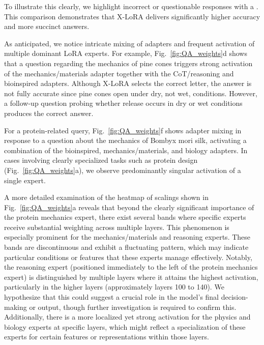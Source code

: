 To illustrate this clearly, we highlight incorrect or questionable responses with a . This comparison demonstrates that X-LoRA delivers significantly higher accuracy and more succinct answers.

As anticipated, we notice intricate mixing of adapters and frequent activation of multiple dominant LoRA experts. For example, Fig.~\ref{fig:QA_weights}d shows that a question regarding the mechanics of pine cones triggers strong activation of the mechanics/materials adapter together with the CoT/reasoning and bioinspired adapters. Although X-LoRA selects the correct letter, the answer is not fully accurate since pine cones open under dry, not wet, conditions. However, a follow-up question probing whether release occurs in dry or wet conditions produces the correct answer.

For a protein-related query, Fig.~\ref{fig:QA_weights}f shows adapter mixing in response to a question about the mechanics of Bombyx mori silk, activating a combination of the bioinspired, mechanics/materials, and biology adapters. In cases involving clearly specialized tasks such as protein design (Fig.~\ref{fig:QA_weights}a), we observe predominantly singular activation of a single expert.

A more detailed examination of the heatmap of scalings shown in Fig.~\ref{fig:QA_weights}a reveals that beyond the clearly significant importance of the protein mechanics expert, there exist several bands where specific experts receive substantial weighting across multiple layers. This phenomenon is especially prominent for the mechanics/materials and reasoning experts. These bands are discontinuous and exhibit a fluctuating pattern, which may indicate particular conditions or features that these experts manage effectively. Notably, the reasoning expert (positioned immediately to the left of the protein mechanics expert) is distinguished by multiple layers where it attains the highest activation, particularly in the higher layers (approximately layers 100 to 140). We hypothesize that this could suggest a crucial role in the model’s final decision-making or output, though further investigation is required to confirm this. Additionally, there is a more localized yet strong activation for the physics and biology experts at specific layers, which might reflect a specialization of these experts for certain features or representations within those layers.

